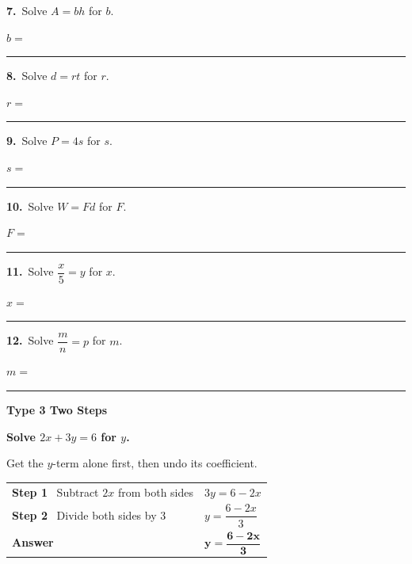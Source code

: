 \documentclass[11pt,letterpaper]{article}
\newcommand{\topicbar}[1]{\needspace{4.5cm}\par\vspace{5mm}
  \begin{tcolorbox}[enhanced,colback=fmtitle,colframe=fmtitle,arc=2mm,left=4mm,top=1.5mm,bottom=1.5mm]
  \color{white}\bfseries\large #1
  \end{tcolorbox}}
\begin{document}
\needspace{3.5cm}\par\vspace{3mm}\noindent \begin{minipage}[t][3.0cm]{0.48\linewidth}\raggedright{\color{fmturn}\bfseries 7.}\ Solve $A = bh$ for $b$.\par\vfill\hfill $b = $\ \rule{3.2cm}{0.4pt}\end{minipage}\hfill \begin{minipage}[t][3.0cm]{0.48\linewidth}\raggedright{\color{fmturn}\bfseries 8.}\ Solve $d = rt$ for $r$.\par\vfill\hfill $r = $\ \rule{3.2cm}{0.4pt}\end{minipage}\par
\needspace{3.5cm}\par\vspace{3mm}\noindent \begin{minipage}[t][3.0cm]{0.48\linewidth}\raggedright{\color{fmturn}\bfseries 9.}\ Solve $P = 4s$ for $s$.\par\vfill\hfill $s = $\ \rule{3.2cm}{0.4pt}\end{minipage}\hfill \begin{minipage}[t][3.0cm]{0.48\linewidth}\raggedright{\color{fmturn}\bfseries 10.}\ Solve $W = Fd$ for $F$.\par\vfill\hfill $F = $\ \rule{3.2cm}{0.4pt}\end{minipage}\par
\needspace{3.5cm}\par\vspace{3mm}\noindent \begin{minipage}[t][3.0cm]{0.48\linewidth}\raggedright{\color{fmturn}\bfseries 11.}\ Solve $\dfrac{x}{5} = y$ for $x$.\par\vfill\hfill $x = $\ \rule{3.2cm}{0.4pt}\end{minipage}\hfill \begin{minipage}[t][3.0cm]{0.48\linewidth}\raggedright{\color{fmturn}\bfseries 12.}\ Solve $\dfrac{m}{n} = p$ for $m$.\par\vfill\hfill $m = $\ \rule{3.2cm}{0.4pt}\end{minipage}\par
\needspace{9cm}\topicbar{Type 3 \quad Two Steps}
\begin{watchme}\textbf{Solve $2x + 3y = 6$ for $y$.}\par\vspace{1mm}
Get the $y$-term alone first, then undo its coefficient.\par\vspace{1mm}
\renewcommand{\arraystretch}{2.1}\begin{tabular}{@{}l l@{}}
\textbf{Step 1} \ Subtract $2x$ from both sides & $3y = 6 - 2x$\\
\textbf{Step 2} \ Divide both sides by 3 & $y = \dfrac{6 - 2x}{3}$\\
\textbf{Answer} & $\boldsymbol{y = \dfrac{6 - 2x}{3}}$
\end{tabular}\end{watchme}
\end{document}
